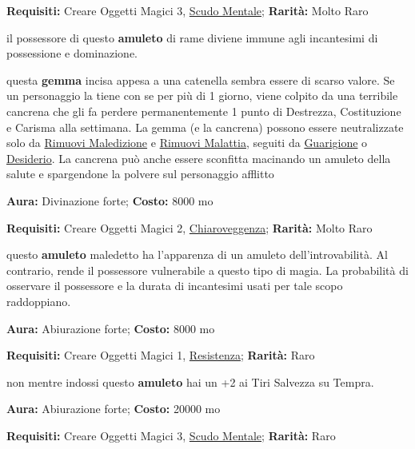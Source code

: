 \begin{multicols}{2}
\textbf{Requisiti:} Creare Oggetti Magici 3, \hyperlink{AnellodelloScudoMentale}{Scudo Mentale}; \textbf{Rarità:} Molto Raro

il possessore di questo \textbf{amuleto} di rame diviene immune agli incantesimi di possessione e dominazione.


questa \textbf{gemma} incisa appesa a una catenella sembra essere di scarso valore. Se un personaggio la tiene con se per più di 1 giorno, viene colpito da una terribile cancrena che gli fa perdere permanentemente 1 punto di Destrezza, Costituzione e Carisma alla settimana. La gemma (e la cancrena) possono essere neutralizzate solo da \hyperlink{Rimuovi Maledizione}{Rimuovi Maledizione} e \hyperlink{Rimuovi Malattia}{Rimuovi Malattia}, seguiti da \hyperlink{BastonedellaGuarigione}{Guarigione} o \hyperlink{Desiderio}{Desiderio}. La cancrena può anche essere sconfitta macinando un amuleto della salute e spargendone la polvere sul personaggio afflitto


\textbf{Aura:} Divinazione forte; \textbf{Costo:} 8000 mo

\textbf{Requisiti:} Creare Oggetti Magici 2, \hyperlink{PozionedellaChiaroveggenzaanimale}{Chiaroveggenza}; \textbf{Rarità:} Molto Raro

questo \textbf{amuleto} maledetto ha l'apparenza di un amuleto dell'introvabilità. Al contrario, rende il possessore vulnerabile a questo tipo di magia. La probabilità di osservare il possessore e la durata di incantesimi usati per tale scopo raddoppiano.


\textbf{Aura:} Abiurazione forte; \textbf{Costo:} 8000 mo

\textbf{Requisiti:} Creare Oggetti Magici 1, \hyperlink{ResistenzaalVeleno}{Resistenza}; \textbf{Rarità:} Raro

non mentre indossi questo \textbf{amuleto} hai un +2 ai Tiri Salvezza su Tempra.


\textbf{Aura:} Abiurazione forte; \textbf{Costo:} 20000 mo

\textbf{Requisiti:} Creare Oggetti Magici 3, \hyperlink{AnellodelloScudoMentale}{Scudo Mentale}; \textbf{Rarità:} Raro


\end{multicols}
